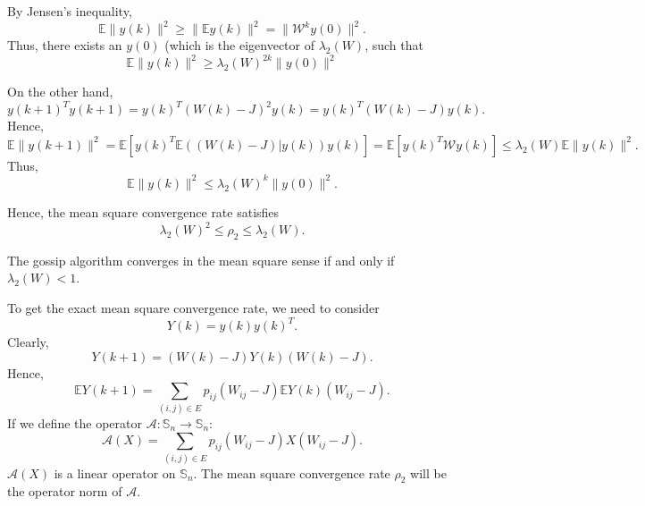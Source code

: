 \documentclass{article}
\begin{document}
By Jensen's inequality,
\begin{equation}
\mathbb E \|y(k)\|^2\geq  \|\mathbb E y(k)\|^2   = \|\mathcal W^k y(0)\|^2.
\label{eq:lowerbound}
\end{equation}
Thus, there exists an $y(0)$ (which is the eigenvector of $\lambda_2(W)$, such that
\begin{displaymath}
  \mathbb E\|y(k)\|^2\geq \lambda_2(W)^{2k}\|y(0)\|^2 
\end{displaymath}


On the other hand,
\begin{displaymath}
 y(k+1)^Ty(k+1) = y(k)^T(W(k)-J)^2 y(k) = y(k)^T (W(k)-J) y(k).
\end{displaymath}
Hence,
\begin{displaymath}
 \mathbb E\| y(k+1)\|^2 =  \mathbb E\left[  y(k)^T \mathbb E((W(k)-J)|y(k)) y(k)\right] = \mathbb E\left[ y(k)^T\mathcal Wy(k) \right]\leq \lambda_2(W) \mathbb E\|y(k)\|^2.
\end{displaymath}
Thus,
\begin{displaymath}
 \mathbb E\|y(k)\|^2\leq \lambda_2(W)^k \|y(0)\|^2. 
\end{displaymath}

Hence, the mean square convergence rate satisfies
\begin{displaymath}
 \lambda_2(W)^2 \leq \rho_2 \leq \lambda_2(W).
\end{displaymath}

The gossip algorithm converges in the mean square sense if and only if $\lambda_2(W)<1$.

To get the exact mean square convergence rate, we need to consider
\begin{displaymath}
 Y(k) = y(k)y(k)^T. 
\end{displaymath}
Clearly,
\begin{displaymath}
 Y(k+1) = (W(k)-J)Y(k) (W(k)-J).
\end{displaymath}
Hence,
\begin{displaymath}
  \mathbb E Y(k+1) = \sum_{(i,j)\in E} p_{ij} (W_{ij}-J)\mathbb EY(k) (W_{ij}-J).
\end{displaymath}
If we define the operator $\mathcal A:\mathbb S_n\rightarrow\mathbb S_n$:
\begin{displaymath}
  \mathcal A(X) = \sum_{(i,j)\in E} p_{ij}  (W_{ij}-J)X (W_{ij}-J).
\end{displaymath}
$\mathcal A(X)$ is a linear operator on $\mathbb S_n$. The mean square convergence rate $\rho_2$ will be the operator norm of $\mathcal A$.
\end{document}

